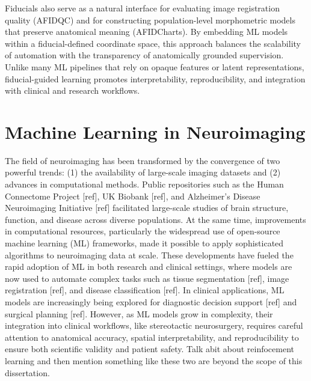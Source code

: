 Fiducials also serve as a natural interface for evaluating image registration quality (AFIDQC) and for constructing population-level morphometric models that preserve anatomical meaning (AFIDCharts). By embedding ML models within a fiducial-defined coordinate space, this approach balances the scalability of automation with the transparency of anatomically grounded supervision. Unlike many ML pipelines that rely on opaque features or latent representations, fiducial-guided learning promotes interpretability, reproducibility, and integration with clinical and research workflows.

\section{Machine Learning in Neuroimaging}
The field of neuroimaging has been transformed by the convergence of two powerful trends: (1) the availability of large-scale imaging datasets and (2) advances in computational methods. Public repositories such as the Human Connectome Project [ref], UK Biobank [ref], and Alzheimer's Disease Neuroimaging Initiative [ref] facilitated large-scale studies of brain structure, function, and disease across diverse populations. At the same time, improvements in computational resources, particularly the widespread use of open-source machine learning (ML) frameworks, made it possible to apply sophisticated algorithms to neuroimaging data at scale. These developments have fueled the rapid adoption of ML in both research and clinical settings, where models are now used to automate complex tasks such as tissue segmentation [ref], image registration [ref], and disease classification [ref]. In clinical applications, ML models are increasingly being explored for diagnostic decision support [ref] and surgical planning [ref]. However, as ML models grow in complexity, their integration into clinical workflows, like stereotactic neurosurgery, requires careful attention to anatomical accuracy, spatial interpretability, and reproducibility to ensure both scientific validity and patient safety. Talk abit about reinfocement learning and then mention something like these two are beyond the scope of this dissertation.  
